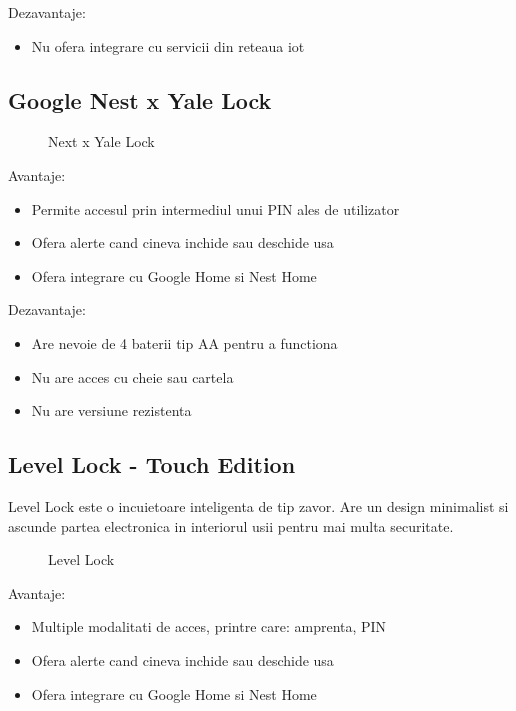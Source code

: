 Dezavantaje:

\begin{itemize}
  \item Nu ofera integrare cu servicii din reteaua \acrshort{iot}
\end{itemize}

\subsection {Google Nest x Yale Lock}

\begin{figure}[h!]
  \centering
  \caption{Next x Yale Lock \cite{YaleLock}}
\end{figure}

Avantaje:
\begin{itemize}
  \item Permite accesul prin intermediul unui PIN ales de utilizator
  \item Ofera alerte cand cineva inchide sau deschide usa
  \item Ofera integrare cu Google Home si Nest Home
\end{itemize}

Dezavantaje:
\begin{itemize}
  \item Are nevoie de 4 baterii tip AA pentru a functiona
  \item Nu are acces cu cheie sau cartela
  \item Nu are versiune rezistenta
\end{itemize}


\subsection {Level Lock - Touch Edition}

Level Lock este o incuietoare inteligenta de tip zavor. Are un design minimalist si ascunde partea electronica in interiorul usii pentru mai multa securitate.

\begin{figure}[h!]
  \centering
  \caption{Level Lock \cite{LevelLock}}
\end{figure}

Avantaje:
\begin{itemize}
  \item Multiple modalitati de acces, printre care: amprenta, PIN
  \item Ofera alerte cand cineva inchide sau deschide usa
  \item Ofera integrare cu Google Home si Nest Home
\end{itemize}

